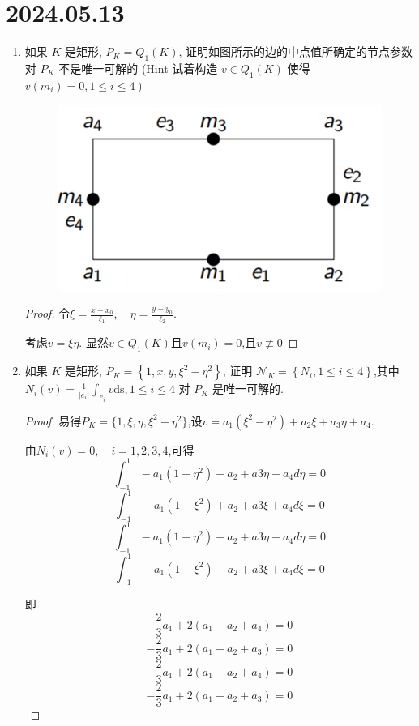 \documentclass[12pt,a4paper]{article}
\begin{document}
	
	\noindent
	
	\section*{2024.05.13}	
	
	\begin{enumerate}
		\item 如果 $K$ 是矩形, $P_K=Q_1(K)$, 证明如图所示的边的中点值所确定的节点参数对 $P_K$ 不是唯一可解的 (Hint 试着构造 $v \in Q_1(K)$ 使得 $\left.v\left(m_i\right)=0,1 \leq i \leq 4\right)$
		\begin{figure}[h]
			\centering
			\includegraphics[width=0.7\linewidth]{rec}
			\label{fig:rec}
		\end{figure}
		
		\begin{proof}
			令$\xi=\frac{x-x_0}{\ell_1},\quad\eta=\frac{y-y_0}{\ell_2}.$
			
			考虑$v = \xi \eta$. 显然$v \in Q_1(K)$且$v(m_i)=0$,且$v \not\equiv 0$
		\end{proof}
		
		\item 如果 $K$ 是矩形, $P_K=\left\{1, x, y, \xi^2-\eta^2\right\}$, 证明 $\mathcal{N}_K=\left\{N_i, 1 \leq i \leq 4\right\}$,其中 $N_i(v)=\frac{1}{\left|e_i\right|} \int_{e_i} v \mathrm{ds}, 1 \leq i \leq 4$ 对 $P_K$ 是唯一可解的.
		
		\begin{proof}
			易得$P_K=\{1,\xi,\eta,\xi^2-\eta^2\}$,设$v = a_1 (\xi^2 - \eta^2) + a_2 \xi +a_3 \eta +a_4$.
			
			由$N_i(v) = 0, \quad i = 1,2,3,4$,可得
			$$\int_{-1}^1 -a_1 (1-\eta^2) + a_2 + a3\eta + a_4 d\eta =0$$
			$$\int_{-1}^1 -a_1 (1-\xi^2) + a_2 + a3\xi + a_4 d\xi =0$$
			$$\int_{-1}^1 -a_1 (1-\eta^2) - a_2 + a3\eta + a_4 d\eta =0$$
			$$\int_{-1}^1 -a_1 (1-\xi^2) - a_2 + a3\xi + a_4 d\xi =0$$
			
			即
			$$-\frac{2}{3}a_1+2(a_1+a_2+a_4)=0$$
			$$-\frac{2}{3}a_1+2(a_1+a_2+a_3)=0$$
			$$-\frac{2}{3}a_1+2(a_1-a_2+a_4)=0$$
			$$-\frac{2}{3}a_1+2(a_1-a_2+a_3)=0$$
			

\end{proof}
\end{enumerate}
\end{document}
